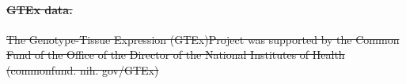 \documentclass[10pt,letterpaper]{article}
\providecommand{\DIFdel}[1]{{\protect\color{red}\sout{#1}}}                      %
\providecommand{\DIFaddbegin}{} %
\providecommand{\DIFdelbegin}{} %
\providecommand{\DIFdelend}{} %
\begin{document}
%

\DIFdelbegin \paragraph{\DIFdel{GTEx data.}}%
\addtocounter{paragraph}{-1}%
\DIFdelend %

\DIFdelbegin \DIFdel{The Genotype-Tissue Expression (GTEx)Project was supported by the
Common Fund of the Office of the Director of the National Institutes of Health (commonfund.
nih. gov/GTEx)}\DIFdelend %
\DIFaddbegin 
\end{document}
